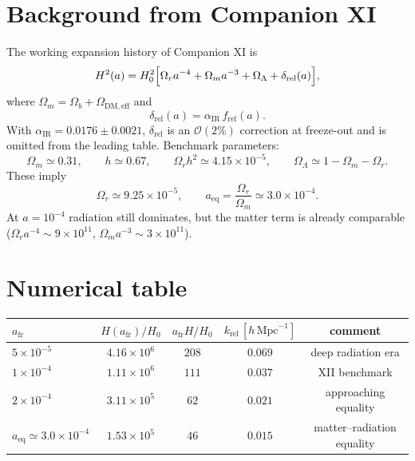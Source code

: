 \documentclass[11pt,a4paper]{article}
\begin{document}
\section{Background from Companion XI}

The working expansion history of Companion XI is
\begin{equation}
  H^2(a)
  =
  H_0^2
  \Bigl[
    \Omega_r a^{-4}
    +
    \Omega_m a^{-3}
    +
    \Omega_\Lambda
    +
    \delta_{\mathrm{rel}}(a)
  \Bigr],
\end{equation}
where \(\Omega_m=\Omega_b+\Omega_{\mathrm{DM,eff}}\) and
\begin{equation}
  \delta_{\mathrm{rel}}(a)
  =
  \alpha_{\mathrm{IR}}\, f_{\mathrm{rel}}(a).
\end{equation}
With \(\alpha_{\mathrm{IR}}=0.0176\pm0.0021\), \(\delta_{\mathrm{rel}}\) is an
\(\mathcal{O}(2\%)\) correction at freeze-out and is omitted from the leading
table. Benchmark parameters:
\begin{equation}
  \Omega_m \simeq 0.31,
  \qquad
  h \simeq 0.67,
  \qquad
  \Omega_r h^2 \simeq 4.15\times10^{-5},
  \qquad
  \Omega_\Lambda \simeq 1-\Omega_m-\Omega_r.
\end{equation}
These imply
\begin{equation}
  \Omega_r \simeq 9.25\times10^{-5},
  \qquad
  a_{\mathrm{eq}}
  =
  \frac{\Omega_r}{\Omega_m}
  \simeq
  3.0\times10^{-4}.
\end{equation}
At \(a=10^{-4}\) radiation still dominates, but the matter term is already
comparable (\(\Omega_r a^{-4}\sim9\times10^{11}\),
\(\Omega_m a^{-3}\sim3\times10^{11}\)).

\section{Numerical table}

\begin{center}
\begin{tabular}{lcccc}
\toprule
\(a_{\mathrm{fr}}\) &
\(H(a_{\mathrm{fr}})/H_0\) &
\(a_{\mathrm{fr}}H/H_0\) &
\(k_{\mathrm{rel}}\,[h\,\mathrm{Mpc}^{-1}]\) &
comment \\
\midrule
\(5\times10^{-5}\) &
\(4.16\times10^{6}\) &
\(208\) &
\(0.069\) &
deep radiation era \\
\(1\times10^{-4}\) &
\(1.11\times10^{6}\) &
\(111\) &
\(0.037\) &
XII benchmark \\
\(2\times10^{-4}\) &
\(3.11\times10^{5}\) &
\(62\) &
\(0.021\) &
approaching equality \\
\(a_{\mathrm{eq}}\simeq3.0\times10^{-4}\) &
\(1.53\times10^{5}\) &
\(46\) &
\(0.015\) &
matter--radiation equality \\
\bottomrule
\end{tabular}
\end{center}
\end{document}
